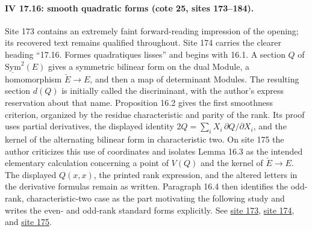 \paragraph{IV 17.16: smooth quadratic forms (cote 25, sites 173--184).}
Site 173 contains an extremely faint forward-reading impression of the opening; its recovered text remains qualified throughout. Site 174 carries the clearer heading ``17.16. Formes quadratiques lisses'' and begins with 16.1. A section \(Q\) of \(\underline{\mathrm{Sym}}^2(E)\) gives a symmetric bilinear form on the dual Module, a homomorphism \(\check E\longrightarrow E\), and then a map of determinant Modules. The resulting section \(d(Q)\) is initially called the discriminant, with the author's express reservation about that name. Proposition 16.2 gives the first smoothness criterion, organized by the residue characteristic and parity of the rank. Its proof uses partial derivatives, the displayed identity \(2Q=\sum_i X_i\,\partial Q/\partial X_i\), and the kernel of the alternating bilinear form in characteristic two. On site 175 the author criticizes this use of coordinates and isolates Lemma 16.3 as the intended elementary calculation concerning a point of \(V(Q)\) and the kernel of \(\check E\longrightarrow E\). The displayed \(Q(x,x)\), the printed rank expression, and the altered letters in the derivative formulas remain as written. Paragraph 16.4 then identifies the odd-rank, characteristic-two case as the part motivating the following study and writes the even- and odd-rank standard forms explicitly. See \href{https://grothendieck.umontpellier.fr/web/viewer.html?file=../25.pdf#page=174}{site 173}, \href{https://grothendieck.umontpellier.fr/web/viewer.html?file=../25.pdf#page=175}{site 174}, and \href{https://grothendieck.umontpellier.fr/web/viewer.html?file=../25.pdf#page=176}{site 175}.

